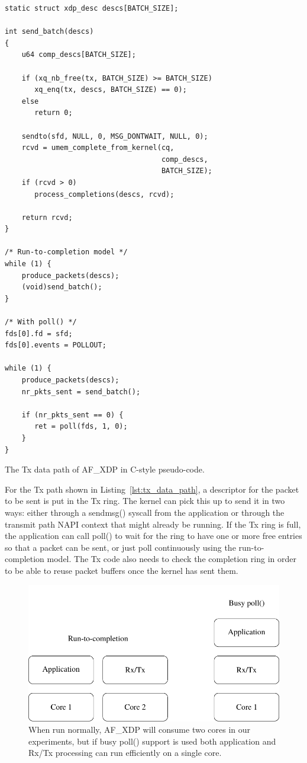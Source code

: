\documentclass[9pt,numbers,reprint]{sigplanconf}
\begin{document}
\begin{listing}[p]
\begin{verbatim}
static struct xdp_desc descs[BATCH_SIZE];

int send_batch(descs)
{
    u64 comp_descs[BATCH_SIZE];

    if (xq_nb_free(tx, BATCH_SIZE) >= BATCH_SIZE)
       xq_enq(tx, descs, BATCH_SIZE) == 0);
    else
       return 0;

    sendto(sfd, NULL, 0, MSG_DONTWAIT, NULL, 0);
    rcvd = umem_complete_from_kernel(cq,
                                     comp_descs,
                                     BATCH_SIZE);
    if (rcvd > 0)
       process_completions(descs, rcvd);

    return rcvd;
}

/* Run-to-completion model */
while (1) {
    produce_packets(descs);
    (void)send_batch();
}

/* With poll() */
fds[0].fd = sfd;
fds[0].events = POLLOUT;

while (1) {
    produce_packets(descs);
    nr_pkts_sent = send_batch();

    if (nr_pkts_sent == 0) {
       ret = poll(fds, 1, 0);
    }
}
\end{verbatim}
\caption{The Tx data path of AF\_XDP in C-style pseudo-code.}
\label{lst:tx_data_path}
\end{listing}

For the Tx path shown in Listing~\ref{lst:tx_data_path}, a descriptor
for the packet to be sent is put in the Tx ring. The kernel can pick
this up to send it in two ways: either through a sendmsg() syscall
from the application or through the transmit path NAPI context that
might already be running. If the Tx ring is full, the application can
call poll() to wait for the ring to have one or more free entries so
that a packet can be sent, or just poll continuously using the
run-to-completion model. The Tx code also needs to check the completion
ring in order to be able to reuse packet buffers once the kernel has
sent them.

\begin{figure}[ht]
\includegraphics[width=.5\textwidth]{two_vs_one_core.pdf}
\caption{When run normally, AF\_XDP will consume two cores in our
  experiments, but if busy poll() support is used both application and
  Rx/Tx processing can run efficiently on a single core.}
\label{fig:two_vs_one_core}
\end{figure}
\end{document}
